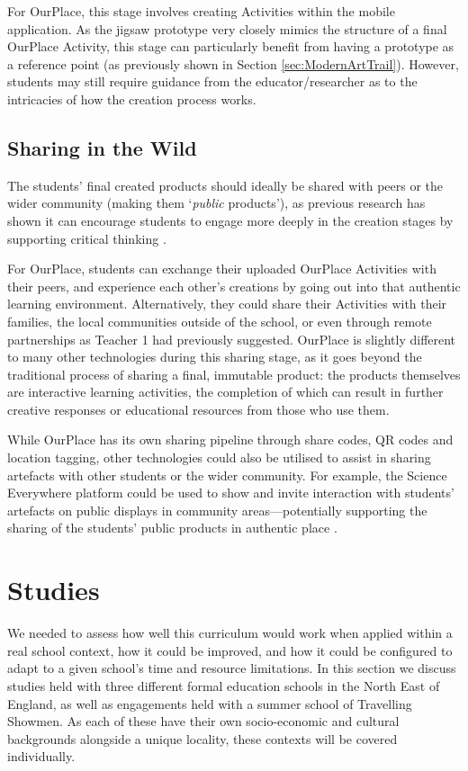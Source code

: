 For OurPlace, this stage involves creating Activities within the mobile application. As the jigsaw prototype very closely mimics the structure of a final OurPlace Activity, this stage can particularly benefit from having a prototype as a reference point (as previously shown in Section \ref{sec:ModernArtTrail}). However, students may still require guidance from the educator/researcher as to the intricacies of how the creation process works.

\subsection{Sharing in the Wild}
The students' final created products should ideally be shared with peers or the wider community (making them `\textit{public} products'), as previous research has shown it can encourage students to engage more deeply in the creation stages by supporting critical thinking \citep{Sarangapani2018}. 

For OurPlace, students can exchange their uploaded OurPlace Activities with their peers, and experience each other's creations by going out into that authentic learning environment. Alternatively, they could share their Activities with their families, the local communities outside of the school, or even through remote partnerships as Teacher 1 had previously suggested. OurPlace is slightly different to many other technologies during this sharing stage, as it goes beyond the traditional process of sharing a final, immutable product: the products themselves are interactive learning activities, the completion of which can result in further creative responses or educational resources from those who use them. 

While OurPlace has its own sharing pipeline through share codes, QR codes and location tagging, other technologies could also be utilised to assist in sharing artefacts with other students or the wider community. For example, the Science Everywhere platform could be used to show and invite interaction with students' artefacts on public displays in community areas---potentially supporting the sharing of the students' public products in authentic place \citep{ahn2018}.

\section{Studies}

We needed to assess how well this curriculum would work when applied within a real school context, how it could be improved, and how it could be configured to adapt to a given school's time and resource limitations. In this section we discuss studies held with three different formal education schools in the North East of England, as well as engagements held with a summer school of Travelling Showmen. As each of these have their own socio-economic and cultural backgrounds alongside a unique locality, these contexts will be covered individually.

